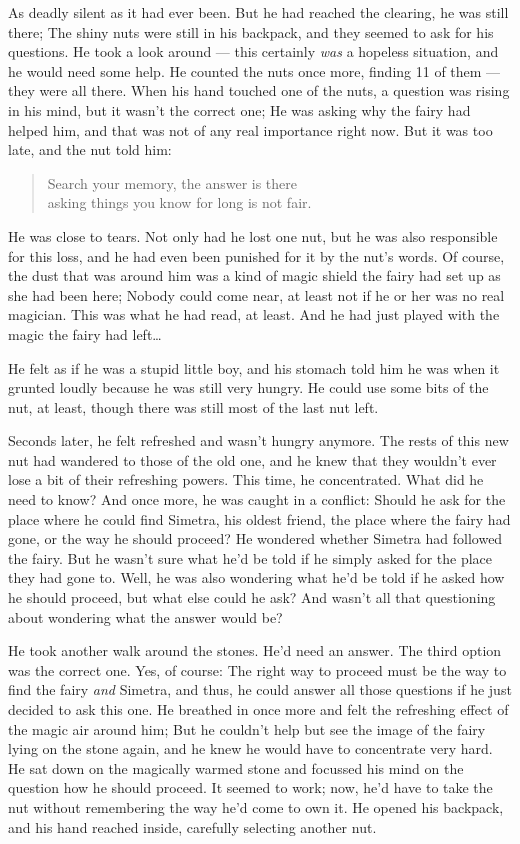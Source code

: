 As deadly silent as it had ever been. But he had reached the clearing, he was still there; The shiny nuts were still in his backpack, and they seemed to ask for his questions. He took a look around --- this certainly \emph{was} a hopeless situation, and he would need some help. He counted the nuts once more, finding 11 of them --- they were all there. When his hand touched one of the nuts, a question was rising in his mind, but it wasn't the correct one; He was asking why the fairy had helped him, and that was not of any real importance right now. But it was too late, and the nut told him: 
\begin{verse}
Search your memory, the answer is there\\
asking things you know for long is not fair. 
\end{verse}
He was close to tears. Not only had he lost one nut, but he was also responsible for this loss, and he had even been punished for it by the nut's words. Of course, the dust that was around him was a kind of magic shield the fairy had set up as she had been here; Nobody could come near, at least not if he or her was no real magician. This was what he had read, at least. And he had just played with the magic the fairy had left\dots

He felt as if he was a stupid little boy, and his stomach told him he was when it grunted loudly because he was still very hungry. He could use some bits of the nut, at least, though there was still most of the last nut left.

Seconds later, he felt refreshed and wasn't hungry anymore. The rests of this new nut had wandered to those of the old one, and he knew that they wouldn't ever lose a bit of their refreshing powers. 
This time, he concentrated. What did he need to know? And once more, he was caught in a conflict: Should he ask for the place where he could find Simetra, his oldest friend, the place where the fairy had gone, or the way he should proceed? He wondered whether Simetra had followed the fairy. But he wasn't sure what he'd be told if he simply asked for the place they had gone to. Well, he was also wondering what he'd be told if he asked how he should proceed, but what else could he ask? And wasn't all that questioning about wondering what the answer would be?

He took another walk around the stones. He'd need an answer. The third option was the correct one. Yes, of course: The right way to proceed must be the way to find the fairy \emph{and} Simetra, and thus, he could answer all those questions if he just decided to ask this one. 
He breathed in once more and felt the refreshing effect of the magic air around him; But he couldn't help but see the image of the fairy lying on the stone again, and he knew he would have to concentrate very hard. He sat down on the magically warmed stone and focussed his mind on the question how he should proceed. It seemed to work; now, he'd have to take the nut without remembering the way he'd come to own it. He opened his backpack, and his hand reached inside, carefully selecting another nut.

